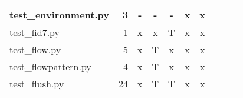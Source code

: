 \documentclass[12pt,a4paper]{report}
\begin{document}
\begin{table}
\begin{tabular}[t]{|l|r|c|c|c|c|c|c|c|c|}
test\_environment.py                    &  3                  &   -        &   -             &   -           &   x              &   x                 \\ \hline
test\_fid7.py                           &  1                  &   x        &   x             &   T           &   x              &   x                 \\ \hline
test\_flow.py                           &  5                  &   x        &   T             &   x           &   x              &   x                 \\ \hline
test\_flowpattern.py                    &  4                  &   x        &   T             &   x           &   x              &   x                 \\ \hline
test\_flush.py                          &  24                 &   x        &   T             &   T           &   x              &   x                 \\ \hline
\end{tabular}
\end{table}
\end{document}
